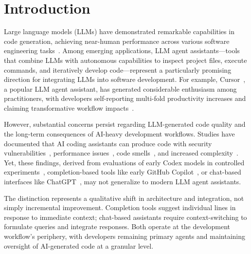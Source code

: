 \section{Introduction}
\label{sec:intro}

Large language models (LLMs) have demonstrated remarkable capabilities in code generation, achieving near-human performance across various software engineering tasks~\cite{DBLP:conf/fose-ws/FanGHLSYZ23, DBLP:journals/tosem/HouZLYWLLLGW24}. 
Among emerging applications, LLM agent assistants---tools that combine LLMs with autonomous capabilities to inspect project files, execute commands, and iteratively develop code---represent a particularly promising direction for integrating LLMs into software development. 
For example, Cursor~\cite{cursor}, a popular LLM agent assistant, has generated considerable enthusiasm among practitioners, with developers self-reporting multi-fold productivity increases and claiming transformative workflow impacts~\cite{cursor-reddit-survey, cursor-10x}.

However, substantial concerns persist regarding LLM-generated code quality and the long-term consequences of AI-heavy development workflows.
Studies have documented that AI coding assistants can produce code with security vulnerabilities~\cite{DBLP:conf/sp/PearceA0DK22,DBLP:conf/ccs/PerryS0B23}, performance issues~\cite{DBLP:conf/issre/LiC0X0S24}, code smells~\cite{DBLP:conf/scam/SiddiqMMJS22}, and increased complexity~\cite{DBLP:journals/tse/LiuTLZZ24}.
Yet, these findings, derived from evaluations of early Codex models in controlled experiments~\cite{DBLP:conf/ccs/PerryS0B23}, completion-based tools like early GitHub Copilot~\cite{DBLP:conf/sp/PearceA0DK22,DBLP:conf/issre/LiC0X0S24,DBLP:conf/scam/SiddiqMMJS22}, or chat-based interfaces like ChatGPT~\cite{DBLP:journals/tse/LiuTLZZ24}, may not generalize to modern LLM agent assistants.

The distinction represents a qualitative shift in architecture and integration, not simply incremental improvement.
Completion tools suggest individual lines in response to immediate context; chat-based assistants require context-switching to formulate queries and integrate responses.
Both operate at the development workflow's periphery, with developers remaining primary agents and maintaining oversight of AI-generated code at a granular level.

